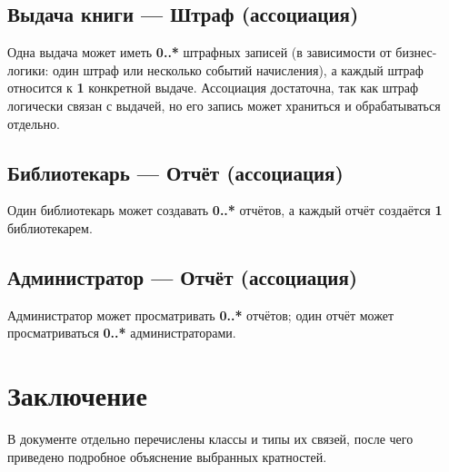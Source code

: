 \documentclass[a4paper,12pt]{article}
\begin{document}
\subsection{Выдача книги --- Штраф (ассоциация)}
Одна выдача может иметь \textbf{0..*} штрафных записей (в зависимости от бизнес-логики: один штраф или несколько событий начисления), а каждый штраф относится к \textbf{1} конкретной выдаче. Ассоциация достаточна, так как штраф логически связан с выдачей, но его запись может храниться и обрабатываться отдельно.

\subsection{Библиотекарь --- Отчёт (ассоциация)}
Один библиотекарь может создавать \textbf{0..*} отчётов, а каждый отчёт создаётся \textbf{1} библиотекарем.

\subsection{Администратор --- Отчёт (ассоциация)}
Администратор может просматривать \textbf{0..*} отчётов; один отчёт может просматриваться \textbf{0..*} администраторами.

\section{Заключение}

В документе отдельно перечислены классы и типы их связей, после чего приведено подробное объяснение выбранных кратностей. 
\end{document}

